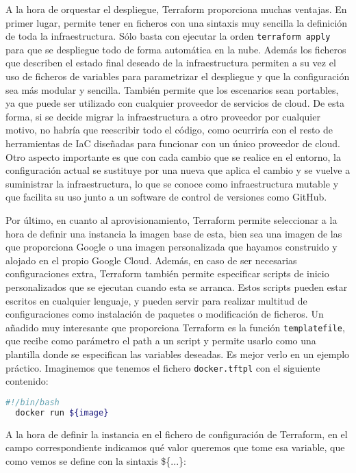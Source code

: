   A la hora de orquestar el despliegue, Terraform proporciona muchas ventajas. En primer lugar, permite tener en ficheros con una sintaxis muy sencilla la definición de toda la infraestructura. Sólo basta con ejecutar la orden \texttt{terraform apply} para que se despliegue todo de forma automática en la nube. Además los ficheros que describen el estado final deseado de la infraestructura permiten a su vez el uso de ficheros de variables para parametrizar el despliegue y que la configuración sea más modular y sencilla. También permite que los escenarios sean portables, ya que puede ser utilizado con cualquier proveedor de servicios de cloud. De esta forma, si se decide migrar la infraestructura a otro proveedor por cualquier motivo, no habría que reescribir todo el código, como ocurriría con el resto de  herramientas de IaC diseñadas para funcionar con un único proveedor de cloud. Otro aspecto importante es que con cada cambio que se realice en el entorno, la configuración actual se sustituye por una nueva que aplica el cambio y se vuelve a suministrar la infraestructura, lo que se conoce como infraestructura mutable y que facilita su uso junto a un software de control de versiones como GitHub.

  Por último, en cuanto al aprovisionamiento, Terraform permite seleccionar a la hora de definir una instancia la imagen base de esta, bien sea una imagen de las que proporciona Google o una imagen personalizada que hayamos construido y alojado en el propio Google Cloud. Además, en caso de ser necesarias configuraciones extra, Terraform también permite especificar scripts de inicio personalizados que se ejecutan cuando esta se arranca. Estos scripts pueden estar escritos en cualquier lenguaje, y pueden servir para realizar multitud de configuraciones como instalación de paquetes o modificación de ficheros. Un añadido muy interesante que proporciona Terraform es la función \texttt{templatefile}, que recibe como parámetro el path a un script y permite usarlo como una plantilla donde se especifican las variables deseadas. Es mejor verlo en un ejemplo práctico. Imaginemos que tenemos el fichero \texttt{docker.tftpl} con el siguiente contenido: \\

  \begin{lstlisting}[language=Bash, caption=Contenido del fichero \texttt{docker.tftpl}]
  #!/bin/bash
  docker run ${image}\end{lstlisting}

  A la hora de definir la instancia en el fichero de configuración de Terraform, en el campo correspondiente indicamos qué valor queremos que tome esa variable, que como vemos se define con la sintaxis \$\{...\}: \\
  
